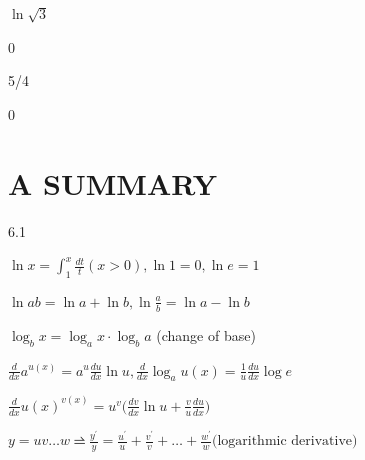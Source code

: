 \documentclass{amsbook}
\begin{document}
\begin{hEnumerateArabic}
\begin{hEnumerateAlpha}
\begin{multicols}{2}
            \end{multicols}
        \end{hEnumerateAlpha}
    \setcounter{enumi}{57}
    \item
        \begin{hEnumerateAlpha}
            \begin{multicols}{2}
                \item \( \ln \sqrt{3}\)  
                \columnbreak
                \item 0
            \end{multicols}
        \end{hEnumerateAlpha}
    \setcounter{enumi}{59}
    \item
        \begin{hEnumerateAlpha}
            \begin{multicols}{2}
                \item 5/4  
                \columnbreak
                \item 0
            \end{multicols}
        \end{hEnumerateAlpha}
\end{hEnumerateArabic}
\section*{A SUMMARY}
\begin{notbottom}
    \begin{hEnumerateArabic}
        \item[6.1]
            \begin{hEnumerateAlpha}{}
                \item[] \(\ln x = \int_{1}^{x} \frac{dt}{t} (x > 0), \ln 1 = 0, \ln e = 1 \)
                \item[] \(\ln ab = \ln a + \ln b, \ln \frac{a}{b} = \ln a - \ln b\)
                \item[] \(\log_b x = \log_a x \cdot \log_b a\) (change of base)
                \item[] \(\frac{d}{dx} a^{u(x)} = a^u \frac{du}{dx} \ln u, \frac{d}{dx} \log_a u(x) = \frac{1}{u} \frac{du}{dx} \log e  \)
                \item[] \(\frac{d}{dx} u(x)^{v(x)} = u^v \big(\frac{dv}{dx} \ln u +  \frac{v}{u} \frac{du}{dx} \big)  \)
                \item[] \( y = uv \ldots w \rightbarharpoon \frac{y^\prime}{y} = \frac{u^\prime}{u} + \frac{v^\prime}{v} + \ldots + \frac{w^\prime}{w} \text{(logarithmic derivative)} \)
            \end{hEnumerateAlpha}
    \end{hEnumerateArabic}
\end{notbottom}
\end{document}
